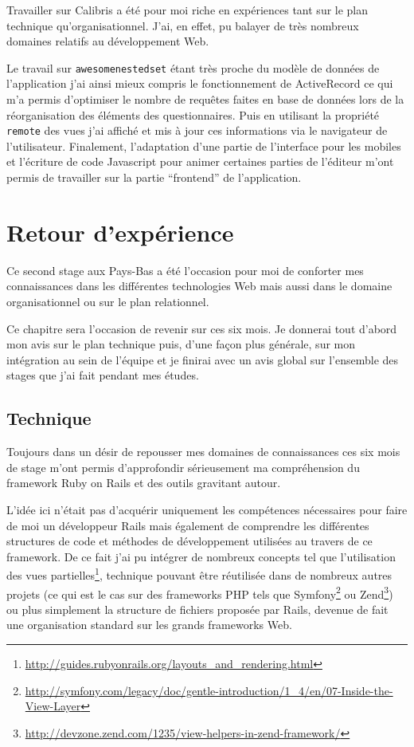 \documentclass[12pt,a4paper]{book}
\begin{document}
Travailler sur Calibris a été pour moi riche en expériences tant sur le plan technique qu'organisationnel. J'ai, en effet, pu balayer de très nombreux domaines relatifs au développement Web. 

Le travail sur \texttt{awesomenestedset} étant très proche du modèle de données de l'application j'ai ainsi mieux compris le fonctionnement de ActiveRecord ce qui m'a permis d'optimiser le nombre de requêtes faites en base de données lors de la réorganisation des éléments des questionnaires.
Puis en utilisant la propriété \texttt{remote} des vues j'ai affiché et mis à jour ces informations via le navigateur de l'utilisateur.
Finalement, l'adaptation d'une partie de l'interface pour les mobiles et l'écriture de code Javascript pour animer certaines parties de l'éditeur m'ont permis de travailler sur la partie ``frontend'' de l'application.

\chapter{Retour d'expérience}

Ce second stage aux Pays-Bas a été l'occasion pour moi de conforter mes connaissances dans les différentes technologies Web mais aussi dans le domaine organisationnel ou sur le plan relationnel.

Ce chapitre sera l'occasion de revenir sur ces six mois. Je donnerai tout d'abord mon avis sur le plan technique puis, d'une façon plus générale, sur mon intégration au sein de l'équipe et je finirai avec un avis global sur l'ensemble des stages que j'ai fait pendant mes études.

\section{Technique}

Toujours dans un désir de repousser mes domaines de connaissances ces six mois de stage m'ont permis d'approfondir sérieusement ma compréhension du framework Ruby on Rails et des outils gravitant autour.

L'idée ici n'était pas d'acquérir uniquement les compétences nécessaires pour faire de moi un développeur Rails mais également de comprendre les différentes structures de code et méthodes de développement utilisées au travers de ce framework. De ce fait j'ai pu intégrer de nombreux concepts tel que l'utilisation des vues partielles\footnote{\url{http://guides.rubyonrails.org/layouts_and_rendering.html}}, technique pouvant être réutilisée dans de nombreux autres projets (ce qui est le cas sur des frameworks PHP tels que Symfony\footnote{\url{http://symfony.com/legacy/doc/gentle-introduction/1_4/en/07-Inside-the-View-Layer}} ou Zend\footnote{\url{http://devzone.zend.com/1235/view-helpers-in-zend-framework/}}) ou plus simplement la structure de fichiers proposée par Rails, devenue de fait une organisation standard sur les grands frameworks Web.
\end{document}
